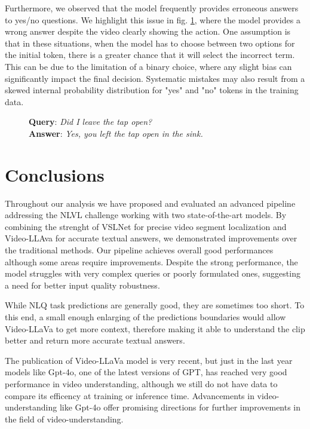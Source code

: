 \documentclass[10pt,twocolumn,letterpaper]{article}
\begin{document}
Furthermore, we observed that the model frequently provides erroneous answers to yes/no questions. We highlight this issue in fig. \ref{fig:animation3}, where the model provides a wrong answer despite the video clearly showing the action. One assumption is that in these situations, when the model has to choose between two options for the initial token, there is a greater chance that it will select the incorrect term. This can be due to the limitation of a binary choice, where any slight bias can significantly impact the final decision. Systematic mistakes may also result from a skewed internal probability distribution for "yes" and "no" tokens in the training data.

\begin{figure}[ht]
  \centering
  \captionsetup{justification=centering} %
      \caption{\textbf{Query}: \textit{Did I leave the tap open?} \\\textbf{Answer}: \textit{Yes, you left the tap open in the sink.}}
  \label{fig:animation3}
\end{figure}

\section{Conclusions}
Throughout our analysis we have proposed and evaluated an advanced pipeline addressing the NLVL challenge working with two state-of-the-art models. By combining the strenght of VSLNet for precise video segment localization and Video-LLAva for accurate textual answers, we demonstrated improvements over the traditional methods.
Our pipeline achieves overall good performances although some areas require improvements.
Despite the strong performance, the model struggles with very complex queries or poorly formulated ones, suggesting a need for better input quality robustness.

While NLQ task predictions are generally good, they are sometimes too short.
To this end, a small enough enlarging of the predictions boundaries would allow Video-LLaVa to get more context, therefore making it able to understand the clip better and return more accurate textual answers.

The publication of Video-LLaVa model is very recent, but just in the last year models like Gpt-4o, one of the latest versions of GPT, has reached very good performance in video understanding, although we still do not have data to compare its efficency at training or inference time.
Advancements in video-understanding like Gpt-4o offer promising directions for further improvements in the field of video-understanding.

{\small


}
\end{document}

